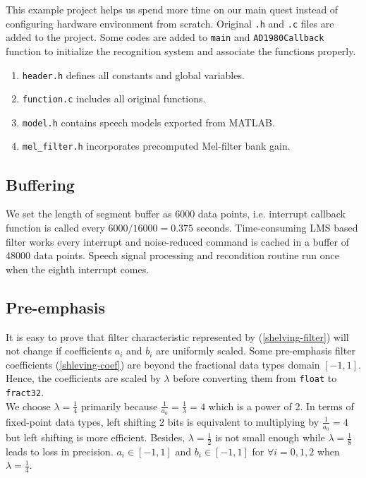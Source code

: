 This example project helps us spend more time on our main quest instead of configuring hardware environment from scratch. Original \texttt{.h} and \texttt{.c} files are added to the project. Some codes are added to \texttt{main} and \texttt{AD1980Callback} function to initialize the recognition system and associate the functions properly.
\begin{enumerate}
\item \texttt{header.h} defines all constants and global variables.
\item \texttt{function.c} includes all original functions.
\item \texttt{model.h} contains speech models exported from MATLAB.
\item \texttt{mel\_filter.h} incorporates precomputed Mel-filter bank gain.
\end{enumerate}


\subsection{Buffering}

We set the length of segment buffer as 6000 data points, i.e. interrupt callback function is called every $6000 / 16000 = 0.375$ seconds. Time-consuming LMS based filter works every interrupt and noise-reduced command is cached in a buffer of 48000 data points. Speech signal processing and recondition routine run once when the eighth interrupt comes.


\subsection{Pre-emphasis}

It is easy to prove that filter characteristic represented by (\ref{shelving-filter}) will not change if coefficients $a_i$ and $b_i$ are uniformly scaled. Some pre-emphasis filter coefficients (\ref{shleving-coef}) are beyond the fractional data types domain $[-1, 1]$. Hence, the coefficients are scaled by $\lambda$ before converting them from \texttt{float} to \texttt{fract32}.\\

We choose $\lambda = \frac{1}{4}$ primarily because $\frac{1}{a_0} = \frac{1}{\lambda} = 4$ which is a power of 2. In terms of fixed-point data types, left shifting 2 bits is equivalent to multiplying by $\frac{1}{a_0} = 4$ but left shifting is more efficient. Besides, $\lambda = \frac{1}{2}$ is not small enough while $\lambda = \frac{1}{8}$ leads to loss in precision. $a_i \in [-1, 1]$ and $b_i \in [-1, 1]$ for $\forall i = 0, 1, 2$ when $\lambda = \frac{1}{4}$.

